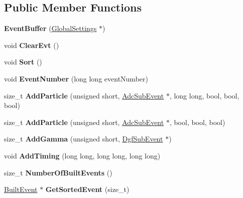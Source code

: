 \subsection*{Public Member Functions}
\begin{DoxyCompactItemize}
\item 
\hypertarget{class_event_buffer_a88ffe92cf134a8cd11d3f52ef7533005}{{\bfseries Event\-Buffer} (\hyperlink{class_global_settings}{Global\-Settings} $\ast$)}\label{class_event_buffer_a88ffe92cf134a8cd11d3f52ef7533005}

\item 
\hypertarget{class_event_buffer_a3517c46566afc4abe5bf635cb84ac685}{void {\bfseries Clear\-Evt} ()}\label{class_event_buffer_a3517c46566afc4abe5bf635cb84ac685}

\item 
\hypertarget{class_event_buffer_ada9809ccfcc0bb691736cf6f54e270e2}{void {\bfseries Sort} ()}\label{class_event_buffer_ada9809ccfcc0bb691736cf6f54e270e2}

\item 
\hypertarget{class_event_buffer_af87a5d899fa6f8dd65216eab060febd6}{void {\bfseries Event\-Number} (long long event\-Number)}\label{class_event_buffer_af87a5d899fa6f8dd65216eab060febd6}

\item 
\hypertarget{class_event_buffer_af109a5cce70d162db4dabd4c0b2c80eb}{size\-\_\-t {\bfseries Add\-Particle} (unsigned short, \hyperlink{class_adc_sub_event}{Adc\-Sub\-Event} $\ast$, long long, bool, bool, bool)}\label{class_event_buffer_af109a5cce70d162db4dabd4c0b2c80eb}

\item 
\hypertarget{class_event_buffer_a8e6f4c031cd9901aec6d547a3ade0ed4}{size\-\_\-t {\bfseries Add\-Particle} (unsigned short, \hyperlink{class_adc_sub_event}{Adc\-Sub\-Event} $\ast$, bool, bool, bool)}\label{class_event_buffer_a8e6f4c031cd9901aec6d547a3ade0ed4}

\item 
\hypertarget{class_event_buffer_a66c0da96e0073a20aa5e579ed2336eb7}{size\-\_\-t {\bfseries Add\-Gamma} (unsigned short, \hyperlink{class_dgf_sub_event}{Dgf\-Sub\-Event} $\ast$)}\label{class_event_buffer_a66c0da96e0073a20aa5e579ed2336eb7}

\item 
\hypertarget{class_event_buffer_aacc0229711693e6df7aa944456c2178f}{void {\bfseries Add\-Timing} (long long, long long, long long)}\label{class_event_buffer_aacc0229711693e6df7aa944456c2178f}

\item 
\hypertarget{class_event_buffer_a2a1210455f715b292c0424f770ab4703}{size\-\_\-t {\bfseries Number\-Of\-Built\-Events} ()}\label{class_event_buffer_a2a1210455f715b292c0424f770ab4703}

\item 
\hypertarget{class_event_buffer_afc435d3702c062b229432300057b4c27}{\hyperlink{class_built_event}{Built\-Event} $\ast$ {\bfseries Get\-Sorted\-Event} (size\-\_\-t)}\label{class_event_buffer_afc435d3702c062b229432300057b4c27}

\end{DoxyCompactItemize}
